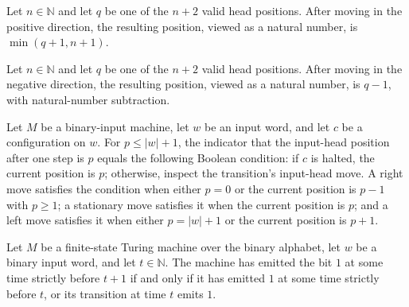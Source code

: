 \begin{theorem}
\label{Complexity.moveInputPos_pos_val}
\leanok
{}
Let $n\in\mathbb{N}$ and let $q$ be one of the $n+2$ valid head positions. After moving
in the positive direction, the resulting position, viewed as a natural number, is
$\min(q+1,n+1)$.
\end{theorem}

\begin{theorem}
\label{Complexity.moveInputPos_neg_val}
\leanok
{}
Let $n\in\mathbb{N}$ and let $q$ be one of the $n+2$ valid head positions. After moving
in the negative direction, the resulting position, viewed as a natural number, is $q-1$,
with natural-number subtraction.
\end{theorem}

\begin{theorem}
\label{Complexity.inp_step}
\leanok
{}
Let $M$ be a binary-input machine, let $w$ be an input word, and let $c$ be a
configuration on $w$. For $p\le |w|+1$, the indicator that the input-head position after
one step is $p$ equals the following Boolean condition: if $c$ is halted, the current
position is $p$; otherwise, inspect the transition's input-head move. A right move
satisfies the condition when either $p=0$ or the current position is $p-1$ with $p\ge1$;
a stationary move satisfies it when the current position is $p$; and a left move
satisfies it when either $p=|w|+1$ or the current position is $p+1$.
\end{theorem}

\begin{theorem}
\label{Complexity.tableauAccepted_succ}
\leanok
{}
Let $M$ be a finite-state Turing machine over the binary alphabet, let $w$ be a binary
input word, and let $t\in\mathbb{N}$. The machine has emitted the bit $1$ at some time
strictly before $t+1$ if and only if it has emitted $1$ at some time strictly before
$t$, or its transition at time $t$ emits $1$.
\end{theorem}

